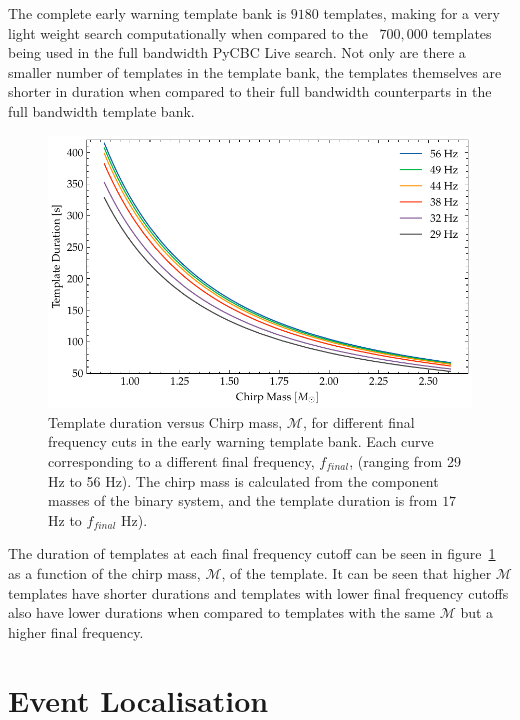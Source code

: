 The complete early warning template bank is $9180$ templates, making for a very light weight search computationally when compared to the ~$700,000$ templates being used in the full bandwidth PyCBC Live search. Not only are there a smaller number of templates in the template bank, the templates themselves are shorter in duration when compared to their full bandwidth counterparts in the full bandwidth template bank.
%
\begin{figure}
    \centering
    \includegraphics[width=\textwidth]{images/6_earlywarning/search/template_bank_duration_mchirp.pdf}
    \caption{Template duration versus Chirp mass, $\mathcal{M}$, for different final frequency cuts in the early warning template bank. Each curve corresponding to a different final frequency, $f_{final}$, (ranging from 29 Hz to 56 Hz). The chirp mass is calculated from the component masses of the binary system, and the template duration is from $17$ Hz to $f_{final}$ Hz).}
    \label{6:fig:tb_duration_mchirp}
\end{figure}
%
The duration of templates at each final frequency cutoff can be seen in figure~\ref{6:fig:tb_duration_mchirp} as a function of the chirp mass, $\mathcal{M}$, of the template. It can be seen that higher $\mathcal{M}$ templates have shorter durations and templates with lower final frequency cutoffs also have lower durations when compared to templates with the same $\mathcal{M}$ but a higher final frequency.

\section{Event Localisation}


